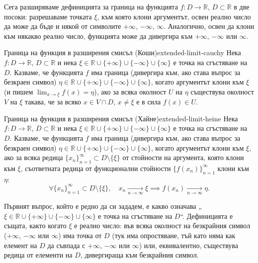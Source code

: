 Сега разширяваме дефиницията за граница на функцията $f : D \to \mathbb{R}$, $D \subset \mathbb{R}$ в две посоки: разрешаваме точката $\xi$, към която клони аргументът, освен реално число да може да бъде и някой от символите $+\infty$, $-\infty$, $\infty$. Аналогично, освен да клони към някакво реално число, функцията може да дивергира към $+\infty$, $-\infty$ или $\infty$.

\begin{definition}{Граница на функция в разширения смисъл (Коши)}{extended-limit-cauchy}
Нека $f : D \to \mathbb{R}$, $D \subset \mathbb{R}$ и нека $\xi \in \mathbb{R} \cup \{+\infty\} \cup \{-\infty\} \cup \{\infty\}$ е точка на сгъстяване на $D$. Казваме, че функцията $f$ има граница (дивергира към, ако става въпрос за безкраен символ) $\eta \in \mathbb{R} \cup \{+\infty\} \cup \{-\infty\} \cup \{\infty\}$, когато аргументът клони към $\xi$ (и пишем $\lim_{x \to \xi} f(x) = \eta$), ако за всяка околност $U$ на $\eta$ съществува околност $V$ на $\xi$ такава, че за всяко $x \in V \cap D$, $x \neq \xi$ е в сила $f(x) \in U$.
\end{definition}

\begin{definition}{Граница на функция в разширения смисъл (Хайне)}{extended-limit-heine}
Нека $f : D \to \mathbb{R}$, $D \subset \mathbb{R}$ и нека $\xi \in \mathbb{R} \cup \{+\infty\} \cup \{-\infty\} \cup \{\infty\}$ е точка на сгъстяване на $D$. Казваме, че функцията $f$ има граница (дивергира към, ако става въпрос за безкраен символ) $\eta \in \mathbb{R} \cup \{+\infty\} \cup \{-\infty\} \cup \{\infty\}$, когато аргументът клони към $\xi$, ако за всяка редица $\{x_n\}_{n=1}^{\infty} \subset D \setminus \{\xi\}$ от стойности на аргумента, която клони към $\xi$, съответната редица от функционални стойности $\{f(x_n)\}_{n=1}^{\infty}$ клони към $\eta$:
\[
\forall \{x_n\}_{n=1}^{\infty} \subset D \setminus \{\xi\}, \quad x_n \xrightarrow[n \to \infty]{} \xi \implies f(x_n) \xrightarrow[n \to \infty]{} \eta.
\]
\end{definition}

Първият въпрос, който е редно да си зададем, е какво означава „$\xi \in \mathbb{R} \cup \{+\infty\} \cup \{-\infty\} \cup \{\infty\}$ е точка на сгъстяване на $D$“. Дефиницията е същата, както когато $\xi$ е реално число: във всяка околност на безкрайния символ ($+\infty$, $-\infty$ или $\infty$) има точка от $D$ (тук има опростяване, тъй като няма как елемент на $D$ да съвпада с $+\infty$, $-\infty$ или $\infty$) или, еквивалентно, съществува редица от елементи на $D$, дивергираща към безкрайния символ.

